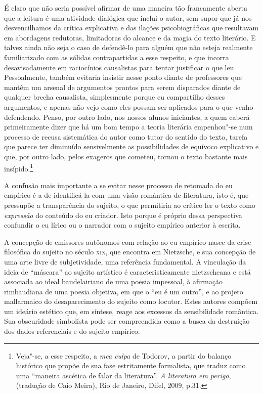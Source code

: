 É claro que não seria possível afirmar de uma maneira tão francamente
aberta que a leitura é uma atividade dialógica que inclui o autor, sem
supor que já nos desvencilhamos da crítica explicativa e das ilações
psicobiográficas que resultavam em abordagens redutoras, limitadoras do
alcance e da magia do texto literário. E talvez ainda não seja o caso de
defendê-lo para alguém que não esteja realmente familiarizado com as
sólidas contrapartidas a esse respeito, e que incorra desavisadamente em
raciocínios causalistas para tentar justificar o que leu. Pessoalmente,
também evitaria insistir nesse ponto diante de professores que mantêm um
arsenal de argumentos prontos para serem disparados diante de qualquer
brecha causalista, simplesmente porque eu compartilho desses argumentos,
e apenas não vejo como eles possam ser aplicados para o que venho
defendendo. Penso, por outro lado, nos nossos alunos iniciantes, a quem
caberá primeiramente dizer que há um bom tempo a teoria literária
empenhou"-se num processo de recusa sistemática do autor como tutor do
sentido do texto, tarefa que parece ter diminuído sensivelmente as
possibilidades de equívoco explicativo e que, por outro lado, pelos
exageros que cometeu, tornou o texto bastante mais insípido.\footnote{Veja"-se,
  a esse respeito, a \emph{mea culpa} de Todorov, a partir do balanço
  histórico que propõe de sua fase estritamente formalista, que traduz
  como uma ``maneira ascética de falar da literatura''. \emph{A
  literatura em perigo}, (tradução de Caio Meira), Rio de Janeiro,
  Difel, 2009, p.31.}

A confusão mais importante a se evitar nesse processo de retomada do eu
empírico é a de identificá-la com uma visão romântica de literatura,
isto é, que pressupõe a transparência do sujeito, o que permitiria ao
crítico ler o texto como \emph{expressão} do conteúdo do eu criador.
Isto porque é próprio dessa perspectiva confundir o eu lírico ou o
narrador com o sujeito empírico anterior à escrita.

A concepção de emissores autônomos com relação ao eu empírico nasce da
crise filosófica do sujeito no século \textsc{xix}, que encontra em
Nietzsche, e sua concepção de uma arte livre de subjetividade, uma
referência fundamental. A vinculação da ideia de ``máscara'' ao sujeito
artístico é caracteristicamente nietzscheana e está associada ao ideal
baudelairiano de uma poesia impessoal, à afirmação rimbaudiana de uma
poesia objetiva, em que o ``eu é um outro'', e ao projeto mallarmaico do
desaparecimento do sujeito como locutor. Estes autores compõem um
ideário estético que, em síntese, reage aos excessos da sensibilidade
romântica. Sua obscuridade simbolista pode ser compreendida como a busca
da destruição dos dados referenciais e do sujeito empírico.

